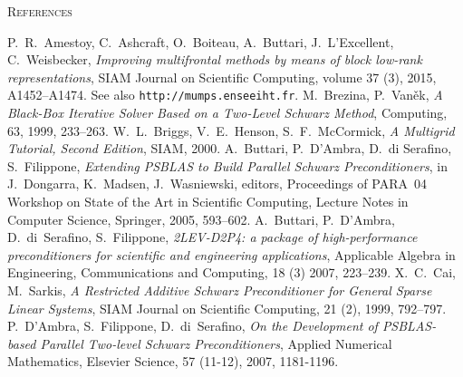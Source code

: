 \begin{thebibliography}{99}
         {\textsc{References}}

%
P.~R.~Amestoy, C.~Ashcraft, O.~Boiteau, A.~Buttari, J.~L'Excellent, C.~Weisbecker,
{\em Improving multifrontal methods by means of block low-rank representations},
SIAM Journal on Scientific Computing, volume 37 (3), 2015, A1452--A1474.
See also {\tt http://mumps.enseeiht.fr}.
%
M.~Brezina, P.~Van\v{e}k,
{\em A Black-Box Iterative Solver Based on a Two-Level Schwarz Method},
Computing, 63, 1999, 233--263.
%
W.~L.~Briggs, V.~E.~Henson, S.~F.~McCormick, 
{\em A Multigrid Tutorial, Second Edition},
SIAM, 2000.
%
A.~Buttari, P.~D'Ambra, D.~di Serafino, S.~Filippone,
{\em Extending PSBLAS to Build Parallel Schwarz Preconditioners},
in J.~Dongarra, K.~Madsen, J.~Wasniewski, editors,
Proceedings of PARA~04 Workshop on State of the Art
in Scientific Computing, Lecture Notes in Computer Science,
Springer, 2005, 593--602.
%
A.~Buttari, P.~D'Ambra, D.~di~Serafino, S.~Filippone,
{\em 2LEV-D2P4: a package of high-performance preconditioners
for scientific and engineering applications},
Applicable Algebra in Engineering, Communications and Computing, 
18 (3) 2007, 223--239.
%
X.~C.~Cai, M.~Sarkis,
{\em A Restricted Additive Schwarz Preconditioner for General Sparse Linear Systems},
SIAM Journal on Scientific Computing, 21 (2), 1999, 792--797.
%
%
%
P.~D'Ambra, S.~Filippone,  D.~di~Serafino,
{\em On the Development of PSBLAS-based Parallel Two-level Schwarz Preconditioners},
Applied Numerical Mathematics, Elsevier Science, 
57 (11-12), 2007, 1181-1196.

\end{thebibliography}
